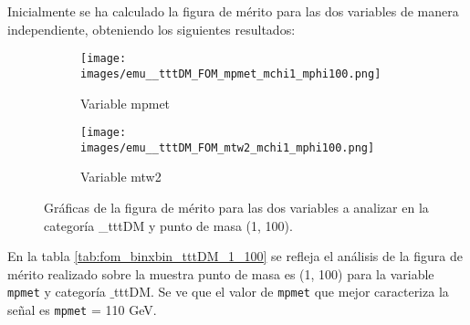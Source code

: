 Inicialmente se ha calculado la figura de mérito para las dos variables de manera independiente, obteniendo los siguientes resultados:\\

\begin{figure}[h!]
     \centering
     \begin{subfigure}[b]{0.43\textwidth}
         \centering
         \texttt{[image: images/emu\_\_tttDM\_FOM\_mpmet\_mchi1\_mphi100.png]}
         \caption{Variable mpmet}
         \label{fig: ANALISISWW}
     \end{subfigure}
     \begin{subfigure}[b]{0.43\textwidth}
         \centering
         \texttt{[image: images/emu\_\_tttDM\_FOM\_mtw2\_mchi1\_mphi100.png]}
         \caption{Variable mtw2}
         \label{fig: ANALISISttbar}
     \end{subfigure}
     \hfill
     \caption{Gráficas de la figura de mérito para las dos variables a analizar en la categoría \_tttDM y punto de masa (1, 100).}
     \label{fig:FOM_sincortes_mpmet_mtw2}
\end{figure}

En la tabla \ref{tab:fom_binxbin_tttDM_1_100} se refleja el análisis de la figura de mérito realizado sobre la muestra punto de masa es (1, 100) para la variable \texttt{mpmet} y categoría $\_$tttDM. Se ve que el valor de \texttt{mpmet} que mejor caracteriza la señal es \texttt{mpmet} = 110 GeV.  



